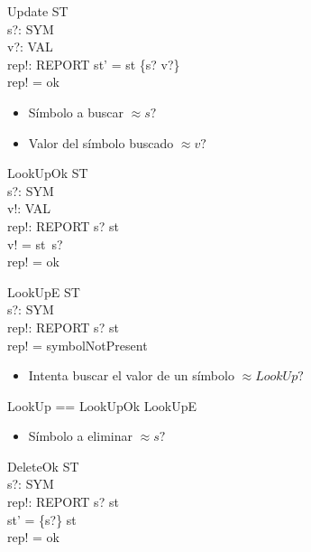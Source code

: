 \begin{schema}{Update}
\Delta ST \\
s?: SYM \\
v?: VAL \\
rep!: REPORT
\where
st' = st \oplus \{s? \mapsto v?\} \\
rep! = ok
\end{schema}

\begin{itemize}
  \item Símbolo a buscar $\approx s?$ \\
  \item Valor del símbolo buscado  $\approx v?$ \\
\end{itemize}

\begin{schema}{LookUpOk}
\Xi ST \\
s?: SYM \\
v!: VAL \\
rep!: REPORT
\where
s? \in \dom st \\
v! = st~s? \\
rep! = ok
\end{schema}

\begin{schema}{LookUpE}
\Xi ST \\
s?: SYM \\
rep!: REPORT
\where
s? \notin \dom st \\
rep! = symbolNotPresent
\end{schema}

\begin{itemize}
  \item Intenta buscar el valor de un símbolo $\approx LookUp?$ \\
\end{itemize}

\begin{zed}
LookUp == LookUpOk \lor LookUpE
\end{zed}

\begin{itemize}
  \item Símbolo a eliminar $\approx s?$ \\
\end{itemize}

\begin{schema}{DeleteOk}
\Delta ST \\
s?: SYM \\
rep!: REPORT
\where
s? \in \dom st \\
st' = \{s?\} \ndres st \\
rep! = ok
\end{schema}

